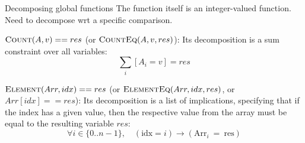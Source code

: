 \documentclass{cons-beamer}
\begin{document}
\begin{frame}{Decomposing global functions}
  \small
  The function itself is an integer-valued function. Need to decompose wrt a specific comparison.

  \begin{example}
    $\textsc{Count}(A, v) == res$ (or $\textsc{CountEq}(A,v,res)$): Its decomposition is a sum constraint over all variables:
      \[
      \sum_{i}  [ A_i = v ]  = res
      \]
  \end{example}

  \begin{example}
    $\textsc{Element}(Arr, idx) == res$ (or $\textsc{ElementEq}(Arr, idx, res)$, or $Arr[idx] == res$): Its decomposition is a list of implications, specifying that if the index has a given value, then the respective value from the array must be equal to the resulting variable $res$:
      \[
      \forall i \in \{0..n - 1\}, \quad (\text{idx} = i) \rightarrow (\text{Arr}_i \ = \ \text{res})
      \]
  \end{example}

\end{frame}
\end{document}

